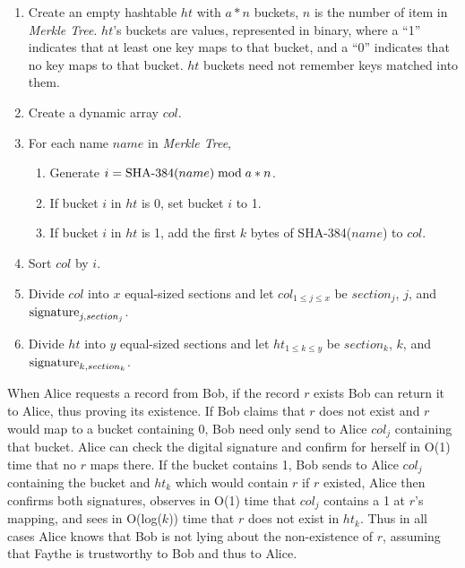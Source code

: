 \begin{enumerate}
	\item Create an empty hashtable $ ht $ with $ a * n $ buckets, $ n $ is the number of item in \emph{Merkle Tree}. $ ht $'s buckets are values, represented in binary, where a ``1'' indicates that at least one key maps to that bucket, and a ``0'' indicates that no key maps to that bucket. $ ht $ buckets need not remember keys matched into them.
	\item Create a dynamic array $ col $.
	\item For each name $ name $ in \emph{Merkle Tree},
	\begin{enumerate}
		\item Generate $ i = \textnormal{SHA-384}(name) \bmod a * n $.
		\item If bucket $ i $ in $ ht $ is 0, set bucket $ i $ to 1.
		\item If bucket $ i $ in $ ht $ is 1, add the first $ k $ bytes of \textnormal{SHA-384}($ name $) to $ col $.
	\end{enumerate}
	\item Sort $ col $ by $ i $.
	\item Divide $ col $ into $ x $ equal-sized sections and let $ col_{ 1 \le j \le x } $ be $ section_{j} $, $ j $, and $ \textnormal{signature}_{j, section_{j}} $.
	\item Divide $ ht $ into $ y $ equal-sized sections and let $ ht_{ 1 \le k \le y } $ be $ section_{k} $, $ k $, and $ \textnormal{signature}_{k, section_{k}} $.
\end{enumerate}

When Alice requests a record from Bob, if the record $ r $ exists Bob can return it to Alice, thus proving its existence. If Bob claims that $ r $ does not exist and $ r $ would map to a bucket containing 0, Bob need only send to Alice $ col_{j} $ containing that bucket. Alice can check the digital signature and confirm for herself in O(1) time that no $ r $ maps there. If the bucket contains 1, Bob sends to Alice $ col_{j} $ containing the bucket and $ ht_{k} $ which would contain $ r $ if $ r $ existed, Alice then confirms both signatures, observes in O(1) time that $ col_{j} $ contains a 1 at $ r $'s mapping, and sees in O(log($ k $)) time that $ r $ does not exist in $ ht_{k} $. Thus in all cases Alice knows that Bob is not lying about the non-existence of $ r $, assuming that Faythe is trustworthy to Bob and thus to Alice.


